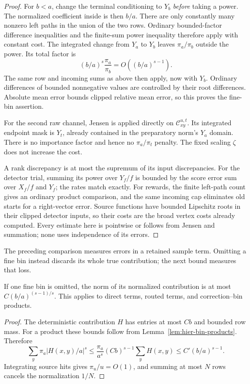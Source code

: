 \begin{proof}
For $b<a$, change the terminal conditioning to $Y_b$ \emph{before}
taking a power.  The normalized coefficient inside is then $b/a$.
There are only constantly many nonzero left paths in the union of the
two rows.  Ordinary bounded-factor difference inequalities and the
finite-sum power inequality therefore apply with constant cost.  The
integrated change from $Y_a$ to $Y_b$ leaves $\pi_a/\pi_b$ outside the
power.  Its total factor is
\[
 (b/a)^s\frac{\pi_a}{\pi_b}=O((b/a)^{s-1}).
\]
The same row and incoming sums as above then apply, now with $Y_b$.
Ordinary differences of bounded nonnegative values are controlled by
their root differences.  Absolute mean error bounds clipped relative
mean error, so this proves the fine-bin assertion.

For the second raw channel, Jensen is applied directly on
$\mathcal C_{xy}^{u,t}$.  Its integrated endpoint mask is $Y_t$, already
contained in the preparatory norm's $Y_a$ domain.  There is no importance
factor and hence no $\pi_a/\pi_t$ penalty.  The fixed scaling $\zeta$
does not increase the cost.

A rank discrepancy is at most the supremum of its input discrepancies.
For the detector trial, summing its power over $Y_f/f$ is bounded by the
score error sum over $X_f/f$ and $Y_f$; the rates match exactly.
For rewards, the finite left-path count gives an ordinary product
comparison, and the same incoming cap eliminates old starts for a
right-vector error.  Source functions have bounded Lipschitz roots in
their clipped detector inputs, so their costs are the broad vertex costs
already computed.  Every estimate here is pointwise or follows from
Jensen and summation; none uses independence of its errors.
\end{proof}

The preceding comparison measures errors in a retained sample term.
Omitting a fine bin instead discards its whole true contribution; the
next bound measures that loss.

\begin{lemma}\label{lem:est-omission}
If one fine bin is omitted, the norm of its normalized contribution is at
most $C(b/a)^{(s-1)/s}$.  This applies to direct terms, routed terms, and
correction--bin products.
\end{lemma}
\begin{proof}
The deterministic contribution $H$ has entries at most $Cb$ and bounded
row mass.  For a product these bounds follow from
Lemma~\ref{lem:hier-bin-products}.  Therefore
\[
 \sum_y\pi_a|H(x,y)/a|^s
 \le \frac{\pi_a}{a^s}(Cb)^{s-1}\sum_yH(x,y)
 \le C'(b/a)^{s-1}.
\]
Integrating source hits gives $\pi_u/u=O(1)$, and summing at most $N$ rows
cancels the normalization $1/N$.
\end{proof}

